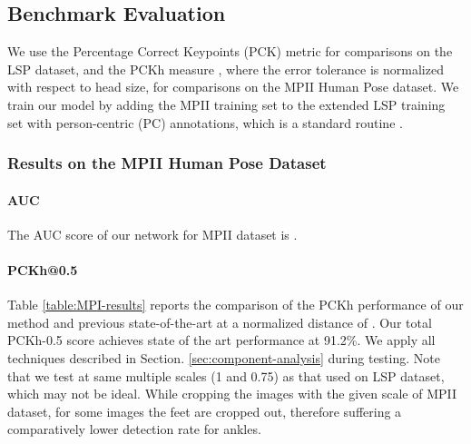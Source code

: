 \documentclass[journal ]{IEEEtran}
\begin{document}
\subsection{Benchmark Evaluation}


We use the Percentage Correct Keypoints (PCK) \cite{yang2013articulated} metric for comparisons on the LSP dataset, and the PCKh measure \cite{andriluka20142d}, where the error tolerance is normalized with respect to head size, for comparisons on the MPII Human Pose dataset.
We train our model by adding the MPII training set to the extended LSP training set with person-centric (PC) annotations, which is a standard routine \cite{belagiannis2016recurrent, pishchulin2016deepcut, insafutdinov2016deepercut, wei2016convolutional}. 

\subsubsection{Results on the MPII Human Pose Dataset}

\paragraph{AUC}
The AUC score of our network for MPII dataset is .

\paragraph{PCKh@0.5}

Table \ref{table:MPI-results} reports the comparison of the PCKh performance of our method and previous state-of-the-art at a normalized distance of .
Our total PCKh-0.5 score achieves state of the art performance at 91.2\%. We apply all techniques described in Section. \ref{sec:component-analysis} during testing. Note that we test at same multiple scales (1 and 0.75) as that used on LSP dataset, which may not be ideal. While cropping the images with the given scale of MPII dataset, for some images the feet are cropped out, therefore suffering a comparatively lower detection rate for ankles.
\end{document}
